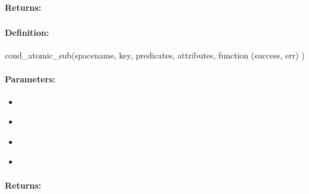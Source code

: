 \paragraph{Returns:}


\pagebreak
\subsubsection{}
\label{api:nodejs:cond_atomic_sub}


\paragraph{Definition:}
\begin{javascriptcode}
cond_atomic_sub(spacename, key, predicates, attributes, function (success, err) {})
\end{javascriptcode}
\paragraph{Parameters:}
\begin{itemize}[noitemsep]
\item {}\\

\item {}\\

\item {}\\

\item {}\\

\end{itemize}

\paragraph{Returns:}


\pagebreak
\subsubsection{}
\label{api:nodejs:atomic_mul}


